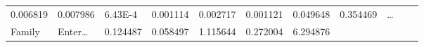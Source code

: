 \documentclass[
]{article}
\begin{document}
\begin{longtable}[]{@{}lllllllllll@{}}
\begin{minipage}[t]{0.09\columnwidth}
0.006819\strut
\end{minipage} & \begin{minipage}[t]{0.06\columnwidth}\raggedright
0.007986\strut
\end{minipage} & \begin{minipage}[t]{0.09\columnwidth}\raggedright
6.43E-4\strut
\end{minipage} & \begin{minipage}[t]{0.06\columnwidth}\raggedright
0.001114\strut
\end{minipage} & \begin{minipage}[t]{0.09\columnwidth}\raggedright
0.002717\strut
\end{minipage} & \begin{minipage}[t]{0.06\columnwidth}\raggedright
0.001121\strut
\end{minipage} & \begin{minipage}[t]{0.06\columnwidth}\raggedright
0.049648\strut
\end{minipage} & \begin{minipage}[t]{0.06\columnwidth}\raggedright
0.354469\strut
\end{minipage} & \begin{minipage}[t]{0.03\columnwidth}\raggedright
\ldots{}\strut
\end{minipage}\tabularnewline
\begin{minipage}[t]{0.06\columnwidth}\raggedright
Family\strut
\end{minipage} & \begin{minipage}[t]{0.06\columnwidth}\raggedright
Enter\ldots{}\strut
\end{minipage} & \begin{minipage}[t]{0.09\columnwidth}\raggedright
0.124487\strut
\end{minipage} & \begin{minipage}[t]{0.06\columnwidth}\raggedright
0.058497\strut
\end{minipage} & \begin{minipage}[t]{0.09\columnwidth}\raggedright
1.115644\strut
\end{minipage} & \begin{minipage}[t]{0.06\columnwidth}\raggedright
0.272004\strut
\end{minipage} & \begin{minipage}[t]{0.09\columnwidth}\raggedright
6.294876\strut
\end{minipage} & \begin{minipage}[t]{0.06\columnwidth}\raggedright

\end{minipage}
\end{longtable}
\end{document}
